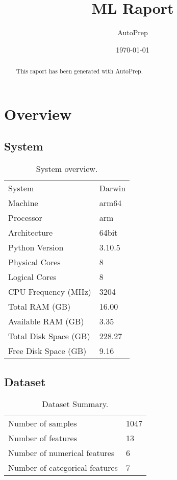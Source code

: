 \documentclass{article}%
\title{ML Raport}%
\author{AutoPrep}%
\date{\today}%
\begin{document}
%
\normalsize%
\maketitle%

    \begin{abstract}
    This raport has been generated with AutoPrep.
    \end{abstract}
\tableofcontents%
\newpage%
\section{Overview}%
\label{sec:Overview}%

%
\subsection{System}%
\label{subsec:System}%

%


\begin{table}[H]%
\begin{center}%
\begin{tabular}{l l}%
\hline%
System&Darwin\\%
Machine&arm64\\%
Processor&arm\\%
Architecture&64bit\\%
Python Version&3.10.5\\%
Physical Cores&8\\%
Logical Cores&8\\%
CPU Frequency (MHz)&3204\\%
Total RAM (GB)&16.00\\%
Available RAM (GB)&3.35\\%
Total Disk Space (GB)&228.27\\%
Free Disk Space (GB)&9.16\\%
\hline%
\end{tabular}%
\end{center}%
\caption{System overview.}%
\end{table}

%
\subsection{Dataset}%
\label{subsec:Dataset}%

%


\begin{table}[H]%
\begin{center}%
\begin{tabular}{l l}%
\hline%
Number of samples&1047\\%
Number of features&13\\%
Number of numerical features&6\\%
Number of categorical features&7\\%
\hline%
\end{tabular}%
\end{center}%
\caption{Dataset Summary.}%
\end{table}
\end{document}
